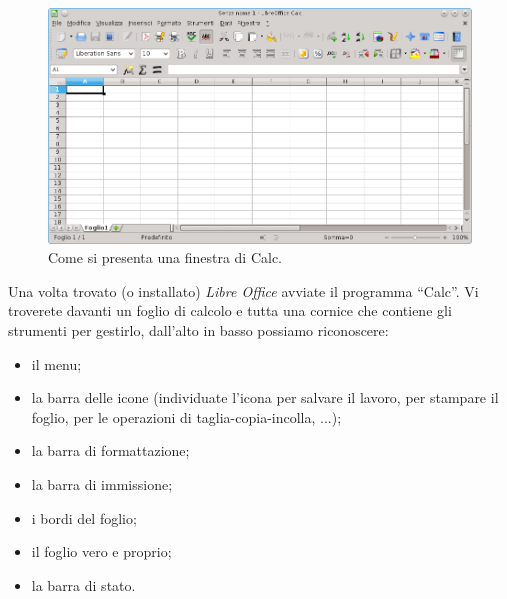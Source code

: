 \begin{inaccessibleblock}
 \begin{figure}[htbp]
\centering
\begin{inaccessibleblock}
 \includegraphics[scale=0.6]{img/00_calc.png}
\end{inaccessibleblock}
\caption{Come si presenta una finestra di Calc.}
\end{figure}
\end{inaccessibleblock}

Una volta trovato (o installato) \emph{Libre Office} avviate il programma ``Calc''.
Vi troverete davanti un foglio di calcolo e tutta una cornice che contiene
gli strumenti per gestirlo, dall'alto in basso possiamo riconoscere:

\begin{itemize} [noitemsep]
\item il menu;
\item {}
la barra delle icone (individuate l'icona per salvare il lavoro,
per stampare il foglio, per le operazioni di taglia-copia-incolla, ...);
\item la barra di formattazione;
\item la barra di immissione;
\item i bordi del foglio;
\item il foglio vero e proprio;
\item la barra di stato.
\end{itemize}

